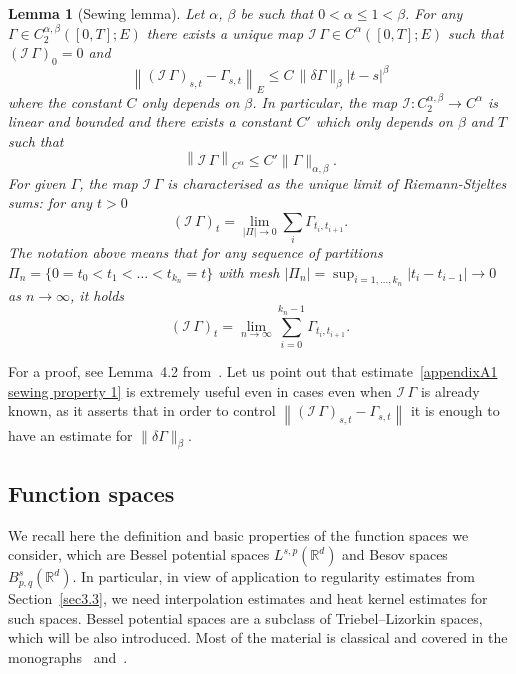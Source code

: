 \documentclass[10pt]{article}
\newtheorem{lemma}{Lemma}
\begin{document}
\begin{lemma}[Sewing lemma]
  \label{appendixA1 sewing lemma}Let $\alpha$, $\beta$ be such that $0 <
  \alpha \leqslant 1 < \beta$. For any $\Gamma \in C^{\alpha, \beta}_2 ([0, T]
  ; E)$ there exists a unique map $\mathcal{I} \, \Gamma \in C^{\alpha} ([0,
  T] ; E)$ such that $\left( \mathcal{I} \, \Gamma \right)_0 = 0$ and
  \begin{equation}
    \left\| \left( \mathcal{I} \, \Gamma \right)_{s, t} - \Gamma_{s, t}
    \right\|_E \leqslant C \, \| \delta \Gamma \|_{\beta}  | t - s |^{\beta}
    \label{appendixA1 sewing property 1}
  \end{equation}
  where the constant $C$ only depends on $\beta$. In particular, the map
  $\mathcal{I} : C^{\alpha, \beta}_2 \rightarrow C^{\alpha}$ is linear and
  bounded and there exists a constant $C'$ which only depends on $\beta$ and
  $T$ such that
  \begin{equation}
    \left\| \mathcal{I} \, \Gamma \right\|_{C^{\alpha}} \leqslant C'  \|
    \Gamma \|_{\alpha, \beta} . \label{appendixA1 sewing property 2}
  \end{equation}
  For given $\Gamma$, the map $\mathcal{I} \, \Gamma$ is characterised as the
  unique limit of Riemann\mbox{-}Stjeltes sums: for any $t > 0$
  \[ \left( \mathcal{I} \, \Gamma \right)_t = \lim_{| \Pi | \rightarrow 0}
     \sum_i \Gamma_{t_i, t_{i + 1}} . \]
  The notation above means that for any sequence of partitions $\Pi_n = \{ 0 =
  t_0 < t_1 < \ldots < t_{k_n} = t \}$ with mesh $| \Pi_n | = \sup_{i = 1,
  \ldots, k_n} | t_i - t_{i - 1} | \rightarrow 0$ as $n \rightarrow \infty$,
  it holds
  \[ \left( \mathcal{I} \, \Gamma \right)_t = \lim_{n \rightarrow \infty}
     \sum_{i = 0}^{k_n - 1} \Gamma_{t_i, t_{i + 1}} . \]
\end{lemma}

For a proof, see Lemma~4.2 from~{\cite{frizhairer}}. Let us point out that
estimate~{\eqref{appendixA1 sewing property 1}} is extremely useful even in
cases even when $\mathcal{I} \, \Gamma$ is already known, as it asserts that
in order to control $\left\| \left( \mathcal{I} \, \Gamma \right)_{s, t} -
\Gamma_{s, t} \right\|$ it is enough to have an estimate for $\| \delta \Gamma
\|_{\beta}$.

\subsection{Function spaces}\label{appendixA2}

We recall here the definition and basic properties of the function spaces we
consider, which are Bessel potential spaces $L^{s, p} (\mathbb{R}^d)$ and
Besov spaces $B^s_{p, q} (\mathbb{R}^d)$. In particular, in view of
application to regularity estimates from Section~\ref{sec3.3}, we need
interpolation estimates and heat kernel estimates for such spaces. Bessel
potential spaces are a subclass of Triebel--Lizorkin spaces, which will be
also introduced. Most of the material is classical and covered in the
monographs~{\cite{bahouri}} and~{\cite{triebel2}}.
\end{document}
